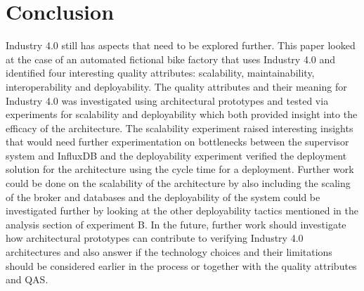 \documentclass[conference]{IEEEtran}
\begin{document}
\section{Conclusion}
Industry 4.0 still has aspects that need to be explored further. This paper looked at the case of an automated fictional bike factory that uses Industry 4.0 and identified four interesting quality attributes: scalability, maintainability, interoperability and deployability. The quality attributes and their meaning for Industry 4.0 was investigated using architectural prototypes and tested via experiments for scalability and deployability which both provided insight into the efficacy of the architecture. The scalability experiment raised interesting insights that would need further experimentation on bottlenecks between the supervisor system and InfluxDB and the deployability experiment verified the deployment solution for the architecture using the cycle time for a deployment. 
Further work could be done on the scalability of the architecture by also including the scaling of the broker and databases and the deployability of the system could be investigated further by looking at the other deployability tactics mentioned in the analysis section of experiment B. In the future, further work should investigate how architectural prototypes can contribute to verifying Industry 4.0 architectures and also answer if the technology choices and their limitations should be considered earlier in the process or together with the quality attributes and QAS.



\vspace{12pt}
\end{document}
